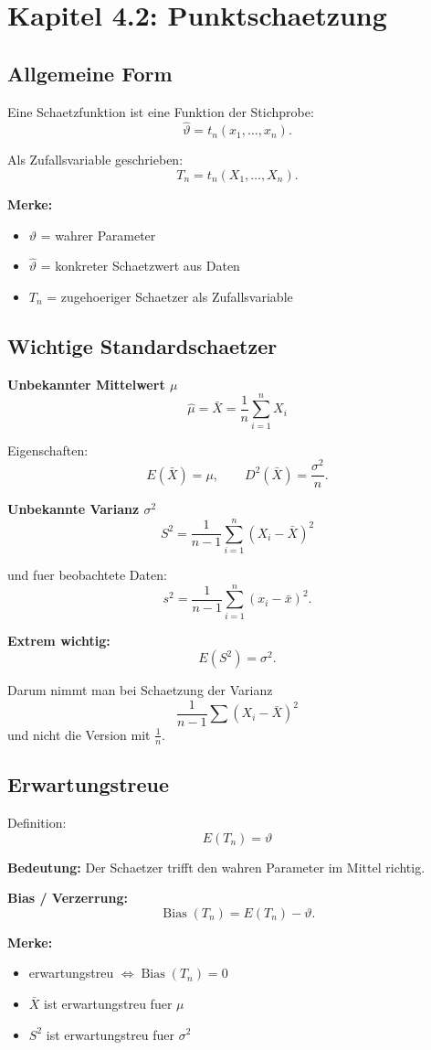 \documentclass[a4paper,11pt]{article}
\begin{document}
\section{Kapitel 4.2: Punktschaetzung}

\subsection{Allgemeine Form}
Eine Schaetzfunktion ist eine Funktion der Stichprobe:
\[
\hat\vartheta=t_n(x_1,\dots,x_n).
\]

Als Zufallsvariable geschrieben:
\[
T_n=t_n(X_1,\dots,X_n).
\]

\textbf{Merke:}
\begin{itemize}
  \item $\vartheta$ = wahrer Parameter
  \item $\hat\vartheta$ = konkreter Schaetzwert aus Daten
  \item $T_n$ = zugehoeriger Schaetzer als Zufallsvariable
\end{itemize}

\subsection{Wichtige Standardschaetzer}
\textbf{Unbekannter Mittelwert $\mu$}
\[
\hat\mu=\bar X=\frac1n\sum_{i=1}^n X_i
\]

Eigenschaften:
\[
E(\bar X)=\mu,\qquad D^2(\bar X)=\frac{\sigma^2}{n}.
\]

\textbf{Unbekannte Varianz $\sigma^2$}
\[
S^2=\frac{1}{n-1}\sum_{i=1}^n (X_i-\bar X)^2
\]

und fuer beobachtete Daten:
\[
s^2=\frac{1}{n-1}\sum_{i=1}^n (x_i-\bar x)^2.
\]

\textbf{Extrem wichtig:}
\[
E(S^2)=\sigma^2.
\]

Darum nimmt man bei Schaetzung der Varianz
\[
\frac{1}{n-1}\sum (X_i-\bar X)^2
\]
und nicht die Version mit $\frac1n$.

\subsection{Erwartungstreue}
Definition:
\[
E(T_n)=\vartheta
\]

\textbf{Bedeutung:}
Der Schaetzer trifft den wahren Parameter im Mittel richtig.

\textbf{Bias / Verzerrung:}
\[
\operatorname{Bias}(T_n)=E(T_n)-\vartheta.
\]

\textbf{Merke:}
\begin{itemize}
  \item erwartungstreu $\Leftrightarrow \operatorname{Bias}(T_n)=0$
  \item $\bar X$ ist erwartungstreu fuer $\mu$
  \item $S^2$ ist erwartungstreu fuer $\sigma^2$
\end{itemize}
\end{document}
